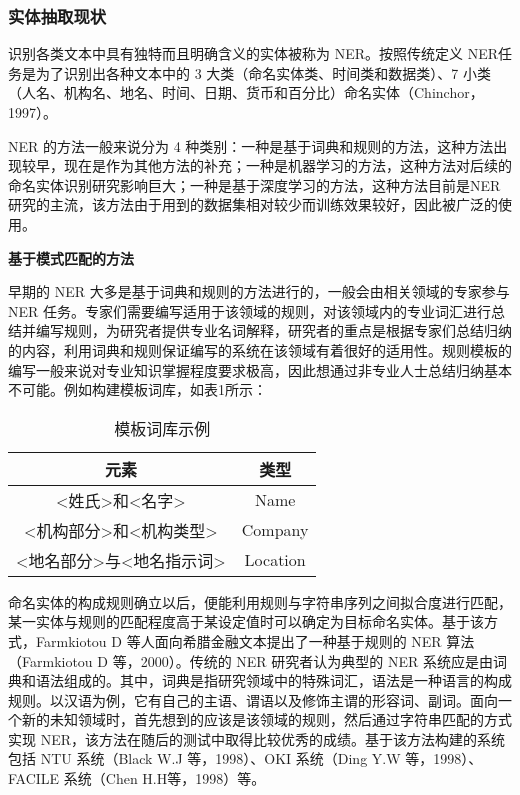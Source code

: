 \documentclass[letterpaper]{article}
\begin{document}
    \subsubsection{实体抽取现状}
    识别各类文本中具有独特而且明确含义的实体被称为 NER。按照传统定义 NER任务是为了识别出各种文本中的 3 大类（命名实体类、时间类和数据类）、7 小类（人名、机构名、地名、时间、日期、货币和百分比）命名实体（Chinchor，1997）。
    
    NER 的方法一般来说分为 4 种类别：一种是基于词典和规则的方法，这种方法出现较早，现在是作为其他方法的补充；一种是机器学习的方法，这种方法对后续的命名实体识别研究影响巨大；一种是基于深度学习的方法，这种方法目前是NER 研究的主流，该方法由于用到的数据集相对较少而训练效果较好，因此被广泛的使用。
    
    \textbf{基于模式匹配的方法}

    早期的 NER 大多是基于词典和规则的方法进行的，一般会由相关领域的专家参与 NER 任务。专家们需要编写适用于该领域的规则，对该领域内的专业词汇进行总结并编写规则，为研究者提供专业名词解释，研究者的重点是根据专家们总结归纳的内容，利用词典和规则保证编写的系统在该领域有着很好的适用性。规则模板的编写一般来说对专业知识掌握程度要求极高，因此想通过非专业人士总结归纳基本不可能。例如构建模板词库，如表1所示：

    \begin{table}[htbp]
      \centering
      \caption{模板词库示例}
      \begin{tabular}{c|c}
        \hline
        元素&类型\\
        \hline
        <姓氏>和<名字>&Name\\
        <机构部分>和<机构类型>&Company\\
        <地名部分>与<地名指示词>&Location\\
        \hline
      \end{tabular}
    \end{table}

    命名实体的构成规则确立以后，便能利用规则与字符串序列之间拟合度进行匹配，某一实体与规则的匹配程度高于某设定值时可以确定为目标命名实体。基于该方式，Farmkiotou  D 等人面向希腊金融文本提出了一种基于规则的 NER 算法（Farmkiotou  D 等，2000）。传统的 NER 研究者认为典型的 NER 系统应是由词典和语法组成的。其中，词典是指研究领域中的特殊词汇，语法是一种语言的构成规则。以汉语为例，它有自己的主语、谓语以及修饰主谓的形容词、副词。面向一个新的未知领域时，首先想到的应该是该领域的规则，然后通过字符串匹配的方式实现 NER，该方法在随后的测试中取得比较优秀的成绩。基于该方法构建的系统包括 NTU 系统（Black W.J 等，1998）、OKI 系统（Ding Y.W 等，1998）、FACILE 系统（Chen H.H等，1998）等。\cite{1}
    
\end{document}

